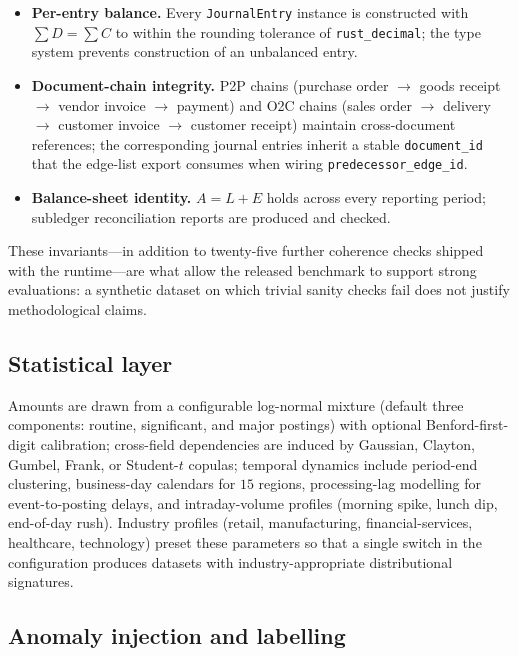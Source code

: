 \begin{itemize}
  \item \textbf{Per-entry balance.}  Every \texttt{JournalEntry}
    instance is constructed with $\sum D = \sum C$ to within the
    rounding tolerance of \texttt{rust\_decimal}; the type system
    prevents construction of an unbalanced entry.
  \item \textbf{Document-chain integrity.}  P2P chains
    (purchase order $\to$ goods receipt $\to$ vendor invoice $\to$
    payment) and O2C chains (sales order $\to$ delivery $\to$
    customer invoice $\to$ customer receipt) maintain
    cross-document references; the corresponding journal entries
    inherit a stable \texttt{document\_id} that the edge-list
    export consumes when wiring \texttt{predecessor\_edge\_id}.
  \item \textbf{Balance-sheet identity.}  $A = L + E$ holds across
    every reporting period; subledger reconciliation reports are
    produced and checked.
\end{itemize}

These invariants---in addition to twenty-five further coherence
checks shipped with the runtime---are what allow the released
benchmark to support strong evaluations: a synthetic dataset on which
trivial sanity checks fail does not justify methodological claims.

\subsection{Statistical layer}
\label{sec:datasynth:stat}

Amounts are drawn from a configurable log-normal mixture (default
three components: routine, significant, and major postings) with
optional Benford-first-digit calibration; cross-field dependencies
are induced by Gaussian, Clayton, Gumbel, Frank, or Student-$t$
copulas; temporal dynamics include period-end clustering, business-day
calendars for $15$ regions, processing-lag modelling for
event-to-posting delays, and intraday-volume profiles
(morning spike, lunch dip, end-of-day rush).  Industry profiles
(retail, manufacturing, financial-services, healthcare, technology)
preset these parameters so that a single switch in the configuration
produces datasets with industry-appropriate distributional
signatures.

\subsection{Anomaly injection and labelling}
\label{sec:datasynth:anomaly}

